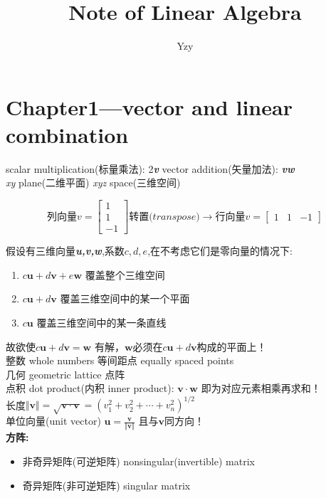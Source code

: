 \documentclass[UTF8]{article}
\begin{document}
    \title{Note of Linear Algebra}
    \author{Yzy}
    \maketitle
    \tableofcontents

    \section{Chapter1---vector and linear combination}
    
    scalar multiplication(标量乘法): 2\textbf{\textit{v}}
    \quad
    vector addition(矢量加法): \textbf{\textit{vw}}
    \\
    \textit{xy} plane(二维平面) \quad \textit{xyz} space(三维空间)
     
    $$
    \textit{列向量v} =
    \begin{bmatrix}
        1 \\ 1 \\ -1  
    \end{bmatrix}
    \textit{转置(transpose)}\rightarrow
    \textit{行向量v} = 
    \begin{bmatrix}
        1 & 1 & -1
    \end{bmatrix}
    $$

    假设有三维向量\textbf{\textit{u,v,w}},系数$c,d,e$,在不考虑它们是零向量的情况下:
    \begin{enumerate}
            \item $c\bm{u}+d\bm{v}+e\bm{w}$ 覆盖整个三维空间
            \item $c\bm{u}+d\bm{v}$ 覆盖三维空间中的某一个平面
            \item $c\bm{u}$ 覆盖三维空间中的某一条直线
    \end{enumerate}
    故欲使$c\bm{u}+d\bm{v} = \bm{w}$ 有解，$\bm{w}$必须在$c\bm{u}+d\bm{v}$构成的平面上！
    \\
    整数 whole numbers \quad 等间距点 equally spaced points
    \\
    几何 geometric \quad lattice 点阵
    \\
    点积 dot product(内积 inner product): $\bm{v} \cdot \bm{w}$ 即为对应元素相乘再求和！
    \\
    长度$\Vert \bm{v} \Vert = \sqrt{\bm{v \cdot v}} = (v_{1}^{2}+v_{2}^{2}+\cdots+v_{n}^{2})^{1/2}$ 
    \\
    单位向量(unit vector) $\bm{u} = \frac{\bm{v}}{ \Vert \bm{v} \Vert}$ 且与$\bm{v}$同方向！ \\
    \textbf{方阵:}
    \begin{itemize}
        \item 非奇异矩阵(可逆矩阵) nonsingular(invertible) matrix
        \item 奇异矩阵(非可逆矩阵) singular matrix
    \end{itemize}
\end{document}
